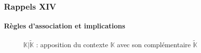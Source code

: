\documentclass[french]{beamer}
\def\KK{\mathbb{K}}
\def\KKn{\tilde{\mathbb{K}}}
\def\KKc{\mathbb{K}|\tilde{\mathbb{K}}}
\begin{document}

\begin{frame}
\frametitle{Rappels XIV}
\framesubtitle{Règles d'association et implications}
\begin{figure}[h]
\label{cap:fig:negctx}
\begin{center}
\begin{cxt}%
\cxtName{}%
%
%
%
%
%
%
%
%
%
%
%
%
\end{cxt}
\end{center}
\caption{$\mathbb{K}|\tilde{\mathbb{K}}$ : apposition du contexte $\KK$ avec son complémentaire $\KKn$}
\end{figure}
\end{frame}
\end{document}
